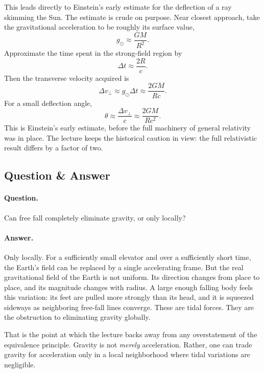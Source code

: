 This leads directly to Einstein's early estimate for the deflection of a ray skimming the Sun. The estimate is crude on purpose. Near closest approach, take the gravitational acceleration to be roughly its surface value,
\begin{equation}
g_\odot \approx \frac{GM}{R^2}.
\end{equation}
Approximate the time spent in the strong-field region by
\begin{equation}
\Delta t \approx \frac{2R}{c}.
\end{equation}
Then the transverse velocity acquired is
\begin{equation}
\Delta v_\perp \approx g_\odot \Delta t \approx \frac{2GM}{Rc}.
\end{equation}
For a small deflection angle,
\begin{equation}
\theta \approx \frac{\Delta v_\perp}{c}\approx \frac{2GM}{Rc^2}.
\end{equation}
This is Einstein's early estimate, before the full machinery of general relativity was in place. The lecture keeps the historical caution in view: the full relativistic result differs by a factor of two.

\subsection{Question \& Answer}

\paragraph{Question.} Can free fall completely eliminate gravity, or only locally?

\paragraph{Answer.} Only locally. For a sufficiently small elevator and over a sufficiently short time, the Earth's field can be replaced by a single accelerating frame. But the real gravitational field of the Earth is not uniform. Its direction changes from place to place, and its magnitude changes with radius. A large enough falling body feels this variation: its feet are pulled more strongly than its head, and it is squeezed sideways as neighboring free-fall lines converge. These are tidal forces. They are the obstruction to eliminating gravity globally.

That is the point at which the lecture backs away from any overstatement of the equivalence principle. Gravity is not \emph{merely} acceleration. Rather, one can trade gravity for acceleration only in a local neighborhood where tidal variations are negligible.

